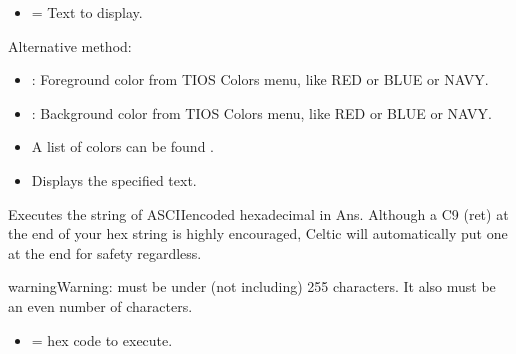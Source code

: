 \documentclass[letterpaper,10pt,english]{sphinxmanual}
\begin{document}
\begin{description}
\begin{description}
\begin{itemize}
\item {} 
\sphinxAtStartPar
{} = Text to display.

\end{itemize}

\end{description}

\sphinxAtStartPar
Alternative method: 
\begin{itemize}
\item {} 
\sphinxAtStartPar
{}: Foreground color from TI\sphinxhyphen{}OS Colors menu, like RED or BLUE or NAVY.

\item {} 
\sphinxAtStartPar
{}: Background color from TI\sphinxhyphen{}OS Colors menu, like RED or BLUE or NAVY.

\end{itemize}
\begin{description}
\begin{itemize}
\item {} 
\sphinxAtStartPar
A list of colors can be found .

\end{itemize}

\begin{itemize}
\item {} 
\sphinxAtStartPar
Displays the specified text.

\end{itemize}

\end{description}

\sphinxAtStartPar
Executes the string of ASCII\sphinxhyphen{}encoded hexadecimal in Ans. Although a C9 (ret) at the end of your hex string is highly encouraged, Celtic will automatically put one at the end for safety regardless.

\begin{sphinxadmonition}{warning}{Warning:}
\sphinxAtStartPar
{} must be under (not including) 255 characters. It also must be an even number of characters.
\end{sphinxadmonition}
\begin{description}
\begin{itemize}
\item {} 
\sphinxAtStartPar
{} = hex code to execute.


\end{itemize}
\end{description}
\end{description}
\end{document}
